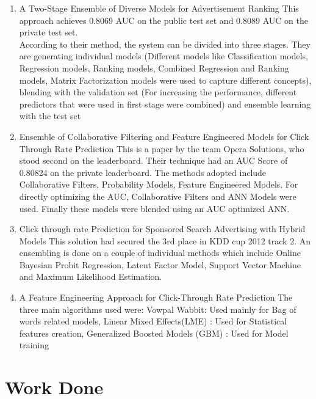 \documentclass[10pt]{article}
\begin{document}
\begin{enumerate}
	\item A Two-Stage Ensemble of Diverse Models for Advertisement Ranking
This approach achieves 0.8069 AUC on the public test set and 0.8089 AUC on the private test set.\\
According to their method, the system can be divided into three stages. They are generating individual models (Different models like Classification models, Regression models, Ranking models, Combined Regression and Ranking models, Matrix Factorization models were used to capture different concepts), blending with the validation set (For increasing the performance, different predictors that were used in first stage were combined) and ensemble learning with the test set 
	\item Ensemble of Collaborative Filtering and Feature Engineered Models for Click Through Rate Prediction
This is a paper by the team Opera Solutions, who stood second on the leaderboard. Their technique had an AUC Score of 0.80824 on the private leaderboard. The methods adopted include Collaborative Filters, Probability Models, Feature Engineered Models. For directly optimizing the AUC, Collaborative Filters and ANN Models were used. Finally these models were blended using an AUC optimized ANN.\\
	\item Click through rate Prediction for Sponsored Search Advertising with Hybrid Models
This solution had secured the 3rd place in KDD cup 2012 track 2. An ensembling is done on a couple of individual methods which include Online Bayesian Probit Regression, Latent Factor Model, Support Vector Machine and Maximum Likelihood Estimation. \\	
	\item A Feature Engineering Approach for Click-Through Rate Prediction
The three main algorithms used were:
Vowpal Wabbit:  Used mainly for Bag of words related models, Linear Mixed Effects(LME) : Used for Statistical features creation, Generalized Boosted Models (GBM) : Used for Model training\\
 
\end{enumerate}
 
\section{Work Done}
\end{document}
